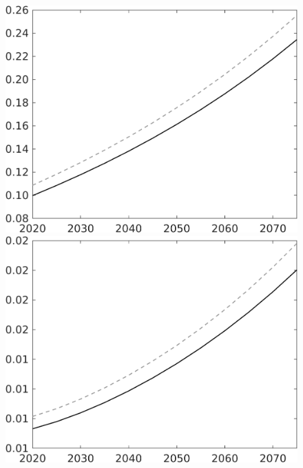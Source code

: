\documentclass[12pt]{article}
\begin{document}
\begin{figure}
	\begin{minipage}[]{0.32\textwidth}
		\includegraphics[width=1\textwidth]{../../codding_model/own_basedOnFried/optimalPol_010922_revision/figures/all_13Sept22/CompTaul_Equlab_LFBAU_Reg0_wsn_spillover0_nsk1_xgr0_knspil0_sep1_countec0_GovRev0_etaa0.79_lgd0.png}
	\end{minipage}	
	\begin{minipage}[]{0.32\textwidth}
		\includegraphics[width=1\textwidth]{../../codding_model/own_basedOnFried/optimalPol_010922_revision/figures/all_13Sept22/CompTaul_Equlab_LFBAU_Reg0_wsf_spillover0_nsk1_xgr0_knspil0_sep1_countec0_GovRev0_etaa0.79_lgd0.png}

\end{minipage}
\end{figure}
\end{document}
